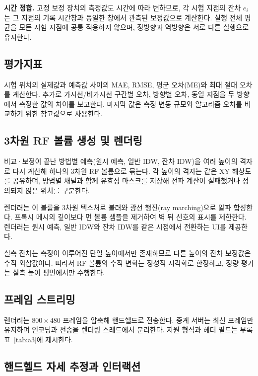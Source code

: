 \documentclass[11pt,a4paper]{article}
\begin{document}
\textbf{시간 정합.} 고정 보정 장치의 측정값도 시간에 따라 변하므로, 각 시험 지점의 잔차 $e_i$는 그
지점의 기록 시간창과 동일한 창에서 관측된 보정값으로 계산한다. 실행 전체 평균을 모든 시험 지점에 공통
적용하지 않으며, 정방향과 역방향은 서로 다른 실행으로 유지한다.

\subsection{평가지표}

시험 위치의 실제값과 예측값 사이의 MAE, RMSE, 평균 오차(ME)와 최대 절대 오차를 계산한다. 추가로
가시선/비가시선 구간별 오차, 방향별 오차, 동일 지점을 두 방향에서 측정한 값의 차이를 보고한다. 마지막
값은 측정 변동 규모와 알고리즘 오차를 비교하기 위한 참고값으로 사용한다.

\subsection{3차원 RF 볼륨 생성 및 렌더링}

비교·보정이 끝난 방법별 예측(원시 예측, 일반 IDW, 잔차 IDW)을 여러 높이의 격자로 다시 계산해 하나의
3차원 RF 볼륨으로 묶는다. 각 높이의 격자는 같은 XY 해상도를 공유하며, 방법별 채널과 함께 유효성 마스크를
저장해 전파 계산이 실패했거나 정의되지 않은 위치를 구분한다.

렌더러는 이 볼륨을 3차원 텍스처로 불러와 광선 행진(ray marching)으로 알파 합성한다. 프록시 메시의
깊이보다 먼 볼륨 샘플을 제거하여 벽 뒤 신호의 표시를 제한한다. 렌더러는 원시 예측, 일반 IDW와 잔차 IDW를
같은 시점에서 전환하는 UI를 제공한다.

실측 잔차는 측정이 이루어진 단일 높이에서만 존재하므로 다른 높이의 잔차 보정값은 수직 외삽값이다. 따라서
RF 볼륨의 수직 변화는 정성적 시각화로 한정하고, 정량 평가는 실측 높이 평면에서만 수행한다.

\subsection{프레임 스트리밍}

렌더러는 $800\times480$ 프레임을 압축해 핸드헬드로 전송한다. 중계 서버는 최신 프레임만 유지하며 인코딩과
전송을 렌더링 스레드에서 분리한다. 지원 형식과 헤더 필드는 부록 표~\ref{tab:a3}에 제시한다.

\subsection{핸드헬드 자세 추정과 인터랙션}
\end{document}
